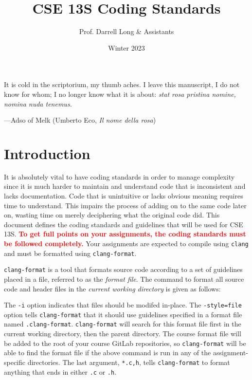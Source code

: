 \documentclass[11pt]{article}
\title{CSE 13S Coding Standards}
\author{Prof. Darrell Long \& Assistants}
\date{Winter 2023}
\begin{document}
\maketitle

\textwidth
\epigraph{It is cold in the scriptorium, my thumb aches. I leave
this manuscript, I do not know for whom; I no longer know what it
is about: \emph{stat rosa pristina nomine, nomina nuda tenemus.}}{---Adso of
Melk (Umberto Eco, \emph{Il nome della rosa})}

\section{Introduction}

It is absolutely vital to have coding standards in order to manage
complexity since it is much harder to maintain and understand code that
is inconsistent and lacks documentation. Code that is unintuitive or
lacks obvious meaning requires time to understand. This impairs the
process of adding on to the same code later on, wasting time on merely
deciphering what the original code did. This document defines the coding
standards and guidelines that will be used for CSE\,13S.
\textcolor{red}{\textbf{To get full points on your assignments, the
coding standards must be followed completely.}} Your assignments are
expected to compile using \texttt{clang} and must be formatted using
\texttt{clang-format}.

\texttt{clang-format} is a tool that formats source code according to a
set of guidelines placed in a file, referred to as the \emph{format
file}. The command to format all source code and header files in the
\emph{current working directory} is given as follows:


The \texttt{-i} option indicates that files should be modifed in-place.
The \texttt{-style=file} option tells \texttt{clang-format} that it
should use guidelines specified in a format file named
\texttt{.clang-format}. \texttt{clang-format} will search for this
format file first in the current working directory, then the parent
directory. The course format file will be added to the root of your
course GitLab repositories, so \texttt{clang-format} will be able to
find the format file if the above command is run in any of the
assignment-specific directories. The last argument, \texttt{*.{c,h}},
tells \texttt{clang-format} to format anything that ends in either
\texttt{.c} or \texttt{.h}.
\end{document}

